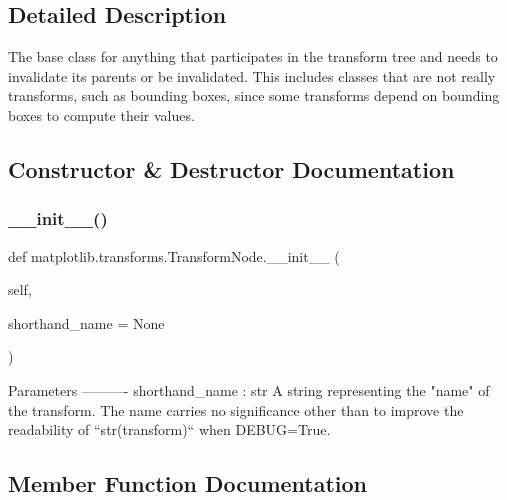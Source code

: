 \subsection{Detailed Description}
\begin{DoxyVerb}The base class for anything that participates in the transform tree
and needs to invalidate its parents or be invalidated.  This includes
classes that are not really transforms, such as bounding boxes, since some
transforms depend on bounding boxes to compute their values.
\end{DoxyVerb}
 

\subsection{Constructor \& Destructor Documentation}
\mbox{\label{classmatplotlib_1_1transforms_1_1TransformNode_ad4ffeea20a242e470bba379e7f0c9cb7}} 
\subsubsection{\texorpdfstring{\+\_\+\+\_\+init\+\_\+\+\_\+()}{\_\_init\_\_()}}
{\footnotesize\ttfamily def matplotlib.\+transforms.\+Transform\+Node.\+\_\+\+\_\+init\+\_\+\+\_\+ (\begin{DoxyParamCaption}\item[{}]{self,  }\item[{}]{shorthand\+\_\+name = {\ttfamily None} }\end{DoxyParamCaption})}

\begin{DoxyVerb}Parameters
----------
shorthand_name : str
    A string representing the "name" of the transform. The name carries
    no significance other than to improve the readability of
    ``str(transform)`` when DEBUG=True.
\end{DoxyVerb}
 

\subsection{Member Function Documentation}
\mbox{\label{classmatplotlib_1_1transforms_1_1TransformNode_ab16afb5e1d976fa5604f8e72b49730ef}} 
